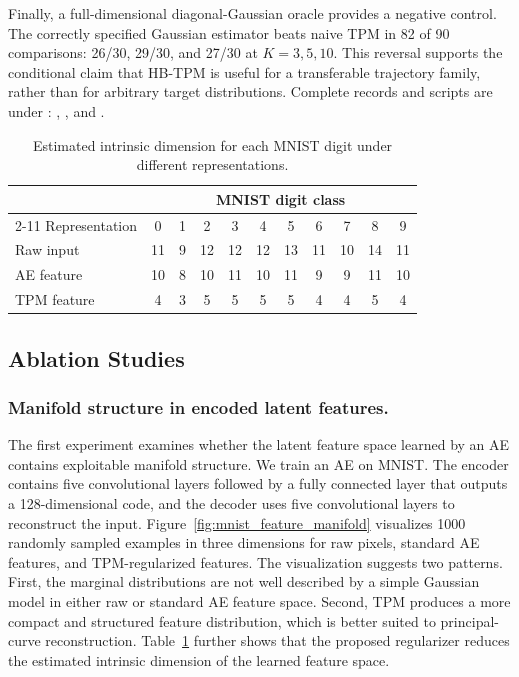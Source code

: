 \documentclass[preprint,12pt,number]{elsarticle}
\begin{document}
Finally, a full-dimensional diagonal-Gaussian oracle provides a negative control. The correctly specified Gaussian estimator beats naive TPM in 82 of 90 comparisons: 26/30, 29/30, and 27/30 at $K=3,5,10$. This reversal supports the conditional claim that HB-TPM is useful for a transferable trajectory family, rather than for arbitrary target distributions. Complete records and scripts are under : , , and .

\begin{table}[H]
	\centering
	\caption{Estimated intrinsic dimension for each MNIST digit under different representations.}
	\label{table:dimension}
	\small
	\setlength{\tabcolsep}{7.5pt}
	\renewcommand{\arraystretch}{1.12}
	{
		\begin{tabular}{lcccccccccc}
			\toprule
			& \multicolumn{10}{c}{MNIST digit class} \\
			\cmidrule(lr){2-11}
			Representation & 0 & 1 & 2 & 3 & 4 & 5 & 6 & 7 & 8 & 9 \\
			\midrule
			Raw input & 11 & 9 & 12 & 12 & 12 & 13 & 11 & 10 & 14 & 11 \\
			AE feature & 10 & 8 & 10 & 11 & 10 & 11 & 9 & 9 & 11 & 10 \\
			TPM feature & 4 & 3 & 5 & 5 & 5 & 5 & 4 & 4 & 5 & 4 \\
			\bottomrule
		\end{tabular}
	}
\end{table}
\subsection{Ablation Studies}
\subsubsection{Manifold structure in encoded latent features.} The first experiment examines whether the latent feature space learned by an AE contains exploitable manifold structure. We train an AE on MNIST. The encoder contains five convolutional layers followed by a fully connected layer that outputs a 128-dimensional code, and the decoder uses five convolutional layers to reconstruct the input. Figure~\ref{fig:mnist_feature_manifold} visualizes 1000 randomly sampled examples in three dimensions for raw pixels, standard AE features, and TPM-regularized features. The visualization suggests two patterns. First, the marginal distributions are not well described by a simple Gaussian model in either raw or standard AE feature space. Second, TPM produces a more compact and structured feature distribution, which is better suited to principal-curve reconstruction. Table~\ref{table:dimension} further shows that the proposed regularizer reduces the estimated intrinsic dimension of the learned feature space.
\end{document}
